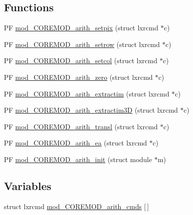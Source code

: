 \subsection*{Functions}
\begin{DoxyCompactItemize}
\item 
P\+F \hyperlink{PIAACMCdesign_2src_2COREMOD__arith_2COREMOD__arith-util_8c_a620380159486515a9dca2152af7454d3}{mod\+\_\+\+C\+O\+R\+E\+M\+O\+D\+\_\+arith\+\_\+setpix} (struct lxrcmd $\ast$c)
\item 
P\+F \hyperlink{PIAACMCdesign_2src_2COREMOD__arith_2COREMOD__arith-util_8c_aeb885e652380aa903a6e8616f49fa72b}{mod\+\_\+\+C\+O\+R\+E\+M\+O\+D\+\_\+arith\+\_\+setrow} (struct lxrcmd $\ast$c)
\item 
P\+F \hyperlink{PIAACMCdesign_2src_2COREMOD__arith_2COREMOD__arith-util_8c_a3c3e340b012e1cf8ba8cfb44a66b5ccc}{mod\+\_\+\+C\+O\+R\+E\+M\+O\+D\+\_\+arith\+\_\+setcol} (struct lxrcmd $\ast$c)
\item 
P\+F \hyperlink{PIAACMCdesign_2src_2COREMOD__arith_2COREMOD__arith-util_8c_a81af934722c893a224dcfa7842c6c318}{mod\+\_\+\+C\+O\+R\+E\+M\+O\+D\+\_\+arith\+\_\+zero} (struct lxrcmd $\ast$c)
\item 
P\+F \hyperlink{PIAACMCdesign_2src_2COREMOD__arith_2COREMOD__arith-util_8c_a95b0d0150c59d81453d16eb3e7077dfd}{mod\+\_\+\+C\+O\+R\+E\+M\+O\+D\+\_\+arith\+\_\+extractim} (struct lxrcmd $\ast$c)
\item 
P\+F \hyperlink{PIAACMCdesign_2src_2COREMOD__arith_2COREMOD__arith-util_8c_a93d5a0872c60ae3979f40eff64fc74b7}{mod\+\_\+\+C\+O\+R\+E\+M\+O\+D\+\_\+arith\+\_\+extractim3\+D} (struct lxrcmd $\ast$c)
\item 
P\+F \hyperlink{PIAACMCdesign_2src_2COREMOD__arith_2COREMOD__arith-util_8c_afd1b0b14e6fb6a813244270a1dd4e3c3}{mod\+\_\+\+C\+O\+R\+E\+M\+O\+D\+\_\+arith\+\_\+transl} (struct lxrcmd $\ast$c)
\item 
P\+F \hyperlink{PIAACMCdesign_2src_2COREMOD__arith_2COREMOD__arith-util_8c_a178389ee1bb679a23f3be9e935664e67}{mod\+\_\+\+C\+O\+R\+E\+M\+O\+D\+\_\+arith\+\_\+ea} (struct lxrcmd $\ast$c)
\item 
P\+F \hyperlink{PIAACMCdesign_2src_2COREMOD__arith_2COREMOD__arith-util_8c_a71c6f02204c17f2a98eb151b35c642aa}{mod\+\_\+\+C\+O\+R\+E\+M\+O\+D\+\_\+arith\+\_\+init} (struct module $\ast$m)
\end{DoxyCompactItemize}
\subsection*{Variables}
\begin{DoxyCompactItemize}
\item 
struct lxrcmd \hyperlink{PIAACMCdesign_2src_2COREMOD__arith_2COREMOD__arith-util_8c_a647ad915126162575efa64543b8fda57}{mod\+\_\+\+C\+O\+R\+E\+M\+O\+D\+\_\+arith\+\_\+cmds} \mbox{[}$\,$\mbox{]}
\end{DoxyCompactItemize}


